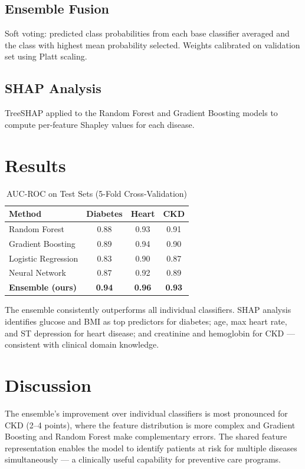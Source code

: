 \documentclass[conference]{IEEEtran}
\begin{document}
\subsection{Ensemble Fusion}
Soft voting: predicted class probabilities from each base classifier averaged and the class with highest mean probability selected. Weights calibrated on validation set using Platt scaling.

\subsection{SHAP Analysis}
TreeSHAP \cite{lundberg2017unified} applied to the Random Forest and Gradient Boosting models to compute per-feature Shapley values for each disease.

\section{Results}

\begin{table}[htbp]
\caption{AUC-ROC on Test Sets (5-Fold Cross-Validation)}
\begin{center}
\begin{tabular}{|l|c|c|c|}
\hline
\textbf{Method} & \textbf{Diabetes} & \textbf{Heart} & \textbf{CKD} \\
\hline
Random Forest & 0.88 & 0.93 & 0.91 \\
Gradient Boosting & 0.89 & 0.94 & 0.90 \\
Logistic Regression & 0.83 & 0.90 & 0.87 \\
Neural Network & 0.87 & 0.92 & 0.89 \\
\textbf{Ensemble (ours)} & \textbf{0.94} & \textbf{0.96} & \textbf{0.93} \\
\hline
\end{tabular}
\label{tab:results}
\end{center}
\end{table}

The ensemble consistently outperforms all individual classifiers. SHAP analysis identifies glucose and BMI as top predictors for diabetes; age, max heart rate, and ST depression for heart disease; and creatinine and hemoglobin for CKD — consistent with clinical domain knowledge.

\section{Discussion}

The ensemble's improvement over individual classifiers is most pronounced for CKD (2--4 points), where the feature distribution is more complex and Gradient Boosting and Random Forest make complementary errors. The shared feature representation enables the model to identify patients at risk for multiple diseases simultaneously — a clinically useful capability for preventive care programs.
\end{document}
